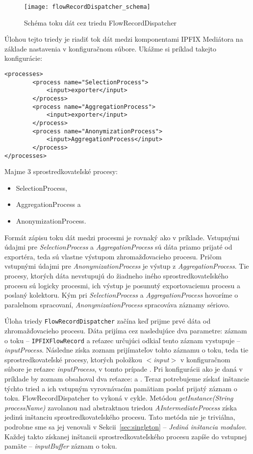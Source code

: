 \begin{figure}[ht!]
\centering
\texttt{[image: flowRecordDispatcher\_schema]}
\caption{Schéma toku dát cez triedu FlowRecordDispatcher}\label{o:flowRecordDispatcher_schema}
\end{figure}

Úlohou tejto triedy je riadiť tok dát medzi komponentami IPFIX Mediátora na základe nastavenia v 
konfiguračnom súbore.
Ukážme si príklad takejto konfigurácie:
\begin{verbatim}
<processes>
        <process name="SelectionProcess">
            <input>exporter</input>
        </process>
        <process name="AggregationProcess">
            <input>exporter</input>
        </process>
        <process name="AnonymizationProcess">
            <input>AggregationProcess</input>
        </process>
</processes>
\end{verbatim}

Majme 3 sprostredkovateľské procesy: 
\begin{itemize}
\item SelectionProcess,
\item AggregationProcess a 
\item AnonymizationProcess.
\end{itemize}

Formát zápisu toku dát medzi procesmi je rovnaký ako v príklade. Vstupnými údajmi pre 
\emph{SelectionProcess} a \emph{AggregationProcess} sú dáta priamo prijaté od exportéra, teda sú 
vlastne výstupom  
zhromažďovacieho procesu. Pričom vstupnými údajmi pre \emph{AnonymizationProcess} je výstup 
z \emph{AggregationProcess}. Tie procesy, ktorých dáta nevstupujú do žiadneho iného sprostredkovateľského 
procesu sú logicky  procesmi, ich výstup je posunutý exportovaciemu procesu a poslaný 
kolektoru. Kým pri \emph{SelectionProcess} a \emph{AggregationProcess} hovoríme o paralelnom spracovaní, 
\emph{AnonymizationProcess} spracováva záznamy sériovo.

Úloha triedy \verb|FlowRecordDispatcher| začína keď prijme prvé dáta od zhromažďovacieho procesu. Dáta prijíma 
cez nasledujúce dva 
parametre: záznam o toku -- \verb|IPFIXFlowRecord| a reťazec určujúci odkiaľ tento záznam vystupuje -- 
\emph{inputProcess}.
Následne získa zoznam prijímateľov tohto záznamu o toku, teda tie sprostredkovateľské procesy, 
ktorých položkou \emph{$<$input$>$} v konfiguračnom súbore je reťazec \emph{inputProcess}, v tomto 
prípade . Pri konfigurácii ako je daná v príklade by zoznam obsahoval dva reťazce: 
 a . Teraz potrebujeme získať inštancie týchto tried a ich 
vstupným vyrovnávacím pamätiam poslať 
prijatý záznam o toku. FlowRecordDispatcher to vykoná v cykle. 
Metódou \emph{getInstance(String processName)} zavolanou nad
abstraktnou triedou \emph{AIntermediateProcess} získa jedinú inštanciu sprostredkovateľského procesu. 
Tato metóda nie je triviálna, podrobne sme sa jej venovali v Sekcii~\ref{sec:singleton} --
\emph{Jediná inštancia modulov}. Každej takto získanej 
inštancii sprostredkovateľského procesu zapíše do vstupnej pamäte -- \emph{inputBuffer} záznam o toku.

